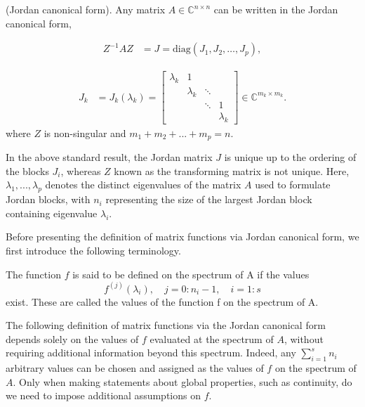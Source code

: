 \begin{definition}
    \label{def:2.1}
    \cite{8}(Jordan canonical form). Any matrix $A \in \mathbb{C}^{n \times n}$ can be written in the Jordan canonical form,

    \begin{align}
        Z^{-1} A Z &= J = \text{diag}(J_1, J_2, \ldots, J_p),
        \label{eq:2.1}
    \end{align}

    \begin{align}
        J_k &= J_k(\lambda_k) = \begin{bmatrix}
        \lambda_k & 1 & & \\
        & \lambda_k & \ddots & \\
        & & \ddots & 1 \\
        & & & \lambda_k
        \end{bmatrix} \in \mathbb{C}^{m_k \times m_k}.
        \label{eq:2.2}
    \end{align}
    where $Z$ is non-singular and $m_1 + m_2 + ... + m_p = n$.
\end{definition}

In the above standard result, the Jordan matrix $J$ is unique up to the ordering of the blocks $J_i$, whereas $Z$ known as the transforming matrix is not unique. Here, $\lambda_1,...,\lambda_p$ denotes the distinct eigenvalues of the matrix $A$ used to formulate Jordan blocks, with $n_i$ representing the size of the largest Jordan block containing eigenvalue $\lambda_i$.

Before presenting the definition of matrix functions via Jordan canonical form, we first introduce the following terminology.

\begin{definition}
    \label{def:2.2}
    \cite{8}The function $f$ is said to be defined on the spectrum of A if the values
    \[
        f^{(j)}(\lambda_i), \quad j=0:n_i-1, \quad i=1:s
    \]
    exist. These are called the values of the function f on the spectrum of A.
\end{definition}

The following definition of matrix functions via the Jordan canonical form depends solely on the values of $f$ evaluated at the spectrum of $A$, without requiring additional information beyond this spectrum. Indeed, any $\sum_{i=1}^s n_i$ arbitrary values can be chosen and assigned as the values of $f$ on the spectrum of $A$. Only when making statements about global properties, such as continuity, do we need to impose additional assumptions on $f$.

